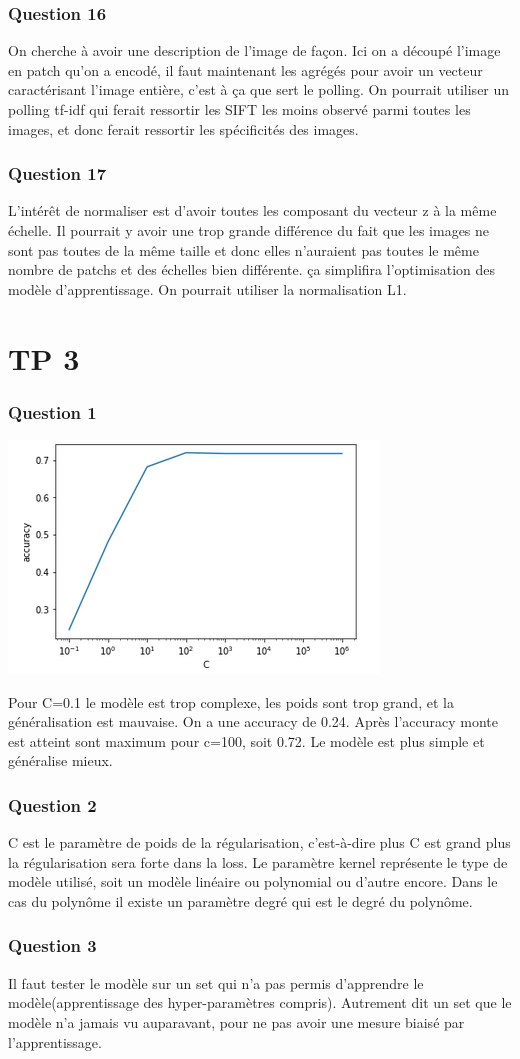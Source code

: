 \documentclass[11pt]{article}
\begin{document}
\section*{\large Question 16}
On cherche à avoir une description de l'image de façon. Ici on a découpé l'image en patch qu'on a encodé, il faut maintenant les agrégés pour avoir un vecteur caractérisant l'image entière, c'est à ça que sert le polling. On pourrait utiliser un polling tf-idf qui ferait ressortir les SIFT les moins observé parmi toutes les images, et donc ferait ressortir les spécificités des images.

\section*{\large Question 17}
L'intérêt de normaliser est d'avoir toutes les composant du vecteur z à la même échelle. Il pourrait y avoir une trop grande différence du fait que les images ne sont pas toutes de la même taille et donc elles n'auraient pas toutes le même nombre de patchs et des échelles bien différente. ça simplifira l'optimisation des modèle d'apprentissage. On pourrait utiliser la normalisation L1. 

\part*{\Large TP 3}
\section*{\large Question 1}
\includegraphics{q2}

Pour C=0.1 le modèle est trop complexe, les poids sont trop grand, et la généralisation est mauvaise. On a une accuracy de 0.24.
Après l'accuracy monte est atteint sont maximum pour c=100, soit 0.72. Le modèle est plus simple et généralise mieux.
\section*{\large Question 2}
C est le paramètre de poids de la régularisation, c'est-à-dire plus C est grand plus la régularisation sera forte dans la loss.
Le paramètre kernel représente le type de modèle utilisé, soit un modèle linéaire ou polynomial ou d'autre encore. Dans le cas du polynôme il existe un paramètre degré qui est le degré du polynôme.

\section*{\large Question 3}
Il faut tester le modèle sur un set qui n'a pas permis d'apprendre le modèle(apprentissage des hyper-paramètres compris). Autrement dit un set que le modèle n'a jamais vu auparavant, pour ne pas avoir une mesure biaisé par l'apprentissage. 
\end{document}
